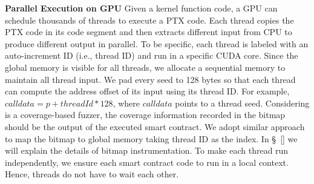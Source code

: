 %


\noindent \textbf{Parallel Execution on GPU}
Given a kernel function code, a GPU can schedule thousands of threads to execute a PTX code. 
%
Each thread copies the PTX code in its code segment and then extracts different input from CPU to produce different output in parallel. 
To be specific, each thread is labeled with an auto-increment ID (i.e., thread ID) and run in a specific CUDA core. 
Since the global memory is visible for all threads, we allocate a sequential memory to maintain all thread input. We pad every seed to 128 bytes so that each thread can compute the address offset of its input using its thread ID. For example, $calldata = p + threadId * 128$, where $calldata$ points to a thread seed. 
Considering {\tool} is a coverage-based fuzzer, the coverage information recorded in the bitmap should be the output of the executed smart contract. 
We adopt similar approach to map the bitmap to global memory taking thread ID as the index. 
In \S~\ref{} we will explain the details of bitmap instrumentation. 
%
To make each thread run independently, we ensure each smart contract code to run in a local context. Hence, threads do not have to wait each other.
%



